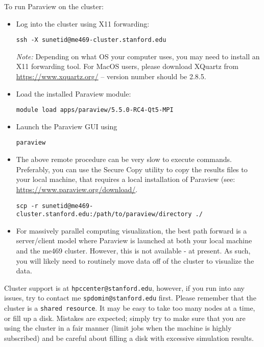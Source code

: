 \documentclass[letterpaper, 11pt]{article}
\begin{document}
\noindent
To run Paraview on the cluster: 
\begin{itemize}[noitemsep]
    \item Log into the cluster using X11 forwarding:

      \begin{center}
      \texttt{ssh -X sunetid@me469-cluster.stanford.edu}
      \end{center}

      \textit{Note:} Depending on what OS your computer uses, you may need to
      install an X11 forwarding tool. For MacOS users, please download 
      XQuartz from \url{https://www.xquartz.org/} -- version number should be 2.8.5. 

    \item Load the installed Paraview module:
      \begin{center}
      \texttt{module load apps/paraview/5.5.0-RC4-Qt5-MPI}
      \end{center}
    
    \item Launch the Paraview GUI using
      \begin{center}
      \texttt{paraview}
      \end{center}
     
    \item The above remote procedure can be very slow to execute commands. Preferably, you can use the Secure Copy utility to 
    copy the results files to your local machine, that requires a local installation of 
        Paraview (see:  \url{https://www.paraview.org/download/}.
      \begin{center}
      \texttt{scp -r sunetid@me469-cluster.stanford.edu:/path/to/paraview/directory ./}
      \end{center}

\item For massively parallel computing visualization, the best path forward is a server/client model where Paraview is launched at both your local machine and the me469 cluster. However, this is not available - at present. As such, you will likely need to routinely move data off of the cluster to visualize the data.
\end{itemize}

\noindent
Cluster support is at \texttt{hpccenter@stanford.edu}, however, if you run into any issues, try to contact me \texttt{spdomin@stanford.edu} first. Please remember that the cluster is a \texttt{shared resource}. It may be easy to take too many nodes at a time, or fill up a disk. Mistakes are expected; simply try to make sure that you are using the cluster in a fair manner (limit jobs when the machine is highly subscribed) and be careful about filling a disk with excessive simulation results.
\end{document}
